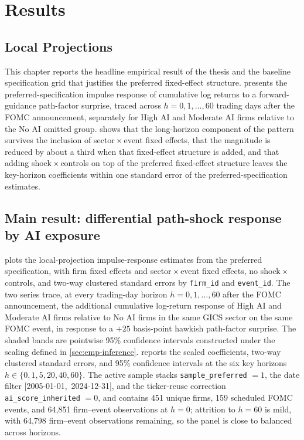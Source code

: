 \chapter{Results}
\label{ch:results}

\section{Local Projections}

 This chapter reports the headline empirical result of the thesis and the
baseline specification grid that justifies the preferred fixed-effect
structure.  presents the preferred-specification impulse
response of cumulative log returns to a forward-guidance path-factor
surprise, traced across $h = 0, 1, \dots, 60$ trading days after the FOMC
announcement, separately for High AI and Moderate AI firms relative to the
No AI omitted group.  shows that the long-horizon
component of the pattern survives the inclusion of sector\,$\times$\,event
fixed effects, that the magnitude is reduced by about a third when that
fixed-effect structure is added, and that adding shock\,$\times$\,controls
on top of the preferred fixed-effect structure leaves the key-horizon
coefficients within one standard error of the preferred-specification
estimates.

\section{Main result: differential path-shock response by AI exposure}
\label{sec:res-main}

 plots the local-projection impulse-response
estimates from the preferred specification, with firm fixed effects and
sector\,$\times$\,event fixed effects, no shock\,$\times$\,controls, and
two-way clustered standard errors by \texttt{firm\_id} and \texttt{event\_id}.
The two series trace, at every trading-day horizon
$h = 0, 1, \dots, 60$ after the FOMC announcement, the additional
cumulative log-return response of High AI and Moderate AI firms relative
to No AI firms in the same GICS sector on the same FOMC event, in response
to a $+25$ basis-point hawkish path-factor surprise. The shaded bands are
pointwise 95\% confidence intervals constructed under the scaling defined
in \cref{sec:emp-inference}.  reports the
scaled coefficients, two-way clustered standard errors, and 95\%
confidence intervals at the six key horizons $h \in \{0, 1, 5, 20, 40, 60\}$.
The active sample stacks \texttt{sample\_preferred} $= 1$, the date filter
\mbox{[2005-01-01, 2024-12-31]}, and the ticker-reuse correction
\texttt{ai\_score\_inherited} $= 0$, and contains 451 unique firms, 159
scheduled FOMC events, and 64{,}851 firm--event observations at $h = 0$;
attrition to $h = 60$ is mild, with 64{,}798 firm--event observations
remaining, so the panel is close to balanced across horizons.

